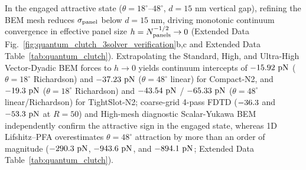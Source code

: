\documentclass[pdflatex,sn-nature]{sn-jnl}
\DeclareRobustCommand{\roundone}[1]{\fpeval{round(#1,1)}}
\DeclareRobustCommand{\roundtwo}[1]{\fpeval{round(#1,2)}}
\begin{document}
In the engaged attractive state ($\theta=18^\circ\text{--}48^\circ$, $d=15\text{ nm}$ vertical gap), refining the BEM mesh reduces $\sigma_{\rm panel}$ below $d=15\text{ nm}$, driving monotonic continuum convergence in effective panel size $h = N_{\rm panels}^{-1/2} \to 0$ (Extended Data Fig.~\ref{fig:quantum_clutch_3solver_verification}b,c and Extended Data Table~\ref{tab:quantum_clutch}). Extrapolating the Standard, High, and Ultra-High Vector-Dyadic BEM forces to $h \to 0$ yields continuum intercepts of $\roundtwo{\RotCeightCompactNtwoBemThetaoneeightRichardsonFZPn}\text{ pN}$ ($\theta=18^\circ$ Richardson) and $\roundtwo{\RotCeightCompactNtwoBemThetafoureightContinuumFZPn}\text{ pN}$ ($\theta=48^\circ$ linear) for Compact-N2, and $\roundtwo{\RotCfourTightslotNtwoBemThetaoneeightRichardsonFZPn}\text{ pN}$ ($\theta=18^\circ$ Richardson) and $\roundtwo{\RotCfourTightslotNtwoBemThetafoureightContinuumFZPn}\text{ pN}$ / $\roundtwo{\RotCfourTightslotNtwoBemThetafoureightRichardsonFZPn}\text{ pN}$ ($\theta=48^\circ$ linear/Richardson) for TightSlot-N2; coarse-grid 4-pass FDTD ($\roundtwo{\RotCeightCompactNtwoMeepThetafoureightFZPn}$ and $\roundtwo{\RotCfourTightslotNtwoMeepThetafoureightFZPn}\text{ pN}$ at $R=50$) and High-mesh diagnostic Scalar-Yukawa BEM independently confirm the attractive sign in the engaged state, whereas 1D Lifshitz--PFA overestimates $\theta=48^\circ$ attraction by more than an order of magnitude ($\roundone{\RotCeightCompactNtwoHighThetaZerofoureightpzeroLifshitzPfaFZPn}\text{ pN}$, $\roundone{\RotCfourTightslotNtwoHighThetaZerofoureightpzeroLifshitzPfaFZPn}\text{ pN}$, and $\roundone{\RotConezeroFractalNthreeHighThetaZerofoureightpzeroLifshitzPfaFZPn}\text{ pN}$; Extended Data Table~\ref{tab:quantum_clutch}).
\end{document}
